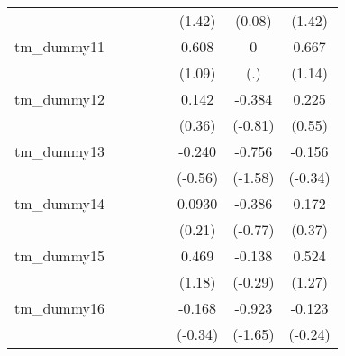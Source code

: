{\begin{tabular}{l*{7}{c}}
            &                     &                     &                     &                     &      (1.42)         &      (0.08)         &      (1.42)         \\
[1em]
tm\_dummy11  &                     &                     &                     &                     &       0.608         &           0         &       0.667         \\
            &                     &                     &                     &                     &      (1.09)         &         (.)         &      (1.14)         \\
[1em]
tm\_dummy12  &                     &                     &                     &                     &       0.142         &      -0.384         &       0.225         \\
            &                     &                     &                     &                     &      (0.36)         &     (-0.81)         &      (0.55)         \\
[1em]
tm\_dummy13  &                     &                     &                     &                     &      -0.240         &      -0.756         &      -0.156         \\
            &                     &                     &                     &                     &     (-0.56)         &     (-1.58)         &     (-0.34)         \\
[1em]
tm\_dummy14  &                     &                     &                     &                     &      0.0930         &      -0.386         &       0.172         \\
            &                     &                     &                     &                     &      (0.21)         &     (-0.77)         &      (0.37)         \\
[1em]
tm\_dummy15  &                     &                     &                     &                     &       0.469         &      -0.138         &       0.524         \\
            &                     &                     &                     &                     &      (1.18)         &     (-0.29)         &      (1.27)         \\
[1em]
tm\_dummy16  &                     &                     &                     &                     &      -0.168         &      -0.923         &      -0.123         \\
            &                     &                     &                     &                     &     (-0.34)         &     (-1.65)         &     (-0.24)         \\

\end{tabular}}
